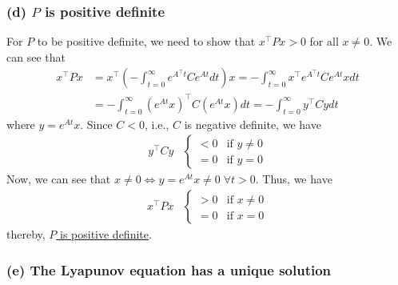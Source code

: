 \subsubsection*{(d) \( P \) is positive definite}

For \( P \) to be positive definite, we need to show that \( x^\top P x > 0 \) for all \( x \neq 0 \).
We can see that
\begin{align*}
    x^\top P x
     & =
    x^\top \left( -\int_{t=0}^{\infty} e^{A^{\top} t} C e^{A t} d t \right) x
    =
    -\int_{t=0}^{\infty} x^\top e^{A^{\top} t} C e^{A t} x d t
    \\ & =
    -\int_{t=0}^{\infty} {(e^{A t} x)}^\top C {(e^{A t} x)} d t
    =
    -\int_{t=0}^{\infty} y^\top C y d t
\end{align*}
where \( y = e^{A t} x \).
Since \( C < 0 \), i.e., \( C \) is negative definite, we have
\begin{align*}
    y^\top C y
     &
    \begin{cases}
        < 0 & \text{if } y \neq 0
        \\
        = 0 & \text{if } y = 0
    \end{cases}
\end{align*}
Now, we can see that \( x \neq 0 \iff y = e^{A t} x \neq 0 \; \forall t > 0 \).
Thus, we have
\begin{align*}
    x^\top P x
     &
    \begin{cases}
        > 0 & \text{if } x \neq 0
        \\
        = 0 & \text{if } x = 0
    \end{cases}
\end{align*}
thereby, \underline{\( P \) is positive definite}.

\subsubsection*{(e) The Lyapunov equation has a unique solution}

